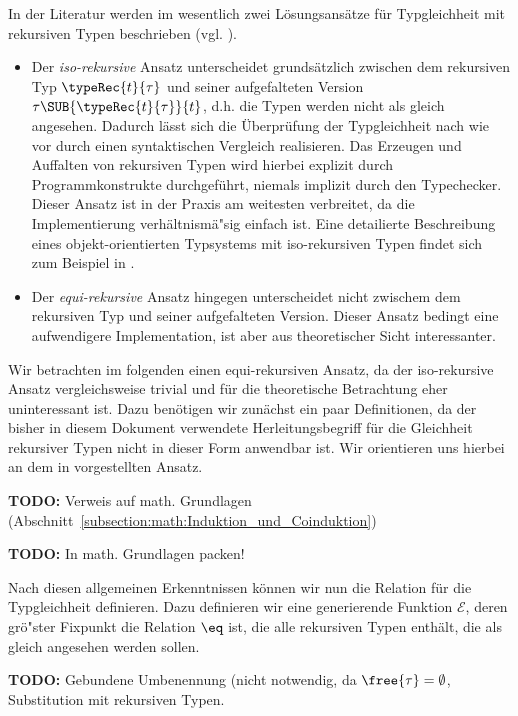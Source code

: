 In der Literatur werden im wesentlich zwei L\"osungsans\"atze f\"ur Typgleichheit mit rekursiven Typen beschrieben
(vgl. \cite[S.276ff]{Pierce02}).
\begin{itemize}
  \item Der {\em iso-rekursive} Ansatz unterscheidet grunds\"atzlich zwischen dem rekursiven Typ
        $\typeRec{t}{\tau}$ und seiner aufgefalteten Version $\tau\SUB{\typeRec{t}{\tau}}{t}$, d.h.
        die Typen werden nicht als gleich angesehen. Dadurch l\"asst sich die \"Uberpr\"ufung der Typgleichheit
        nach wie vor durch einen syntaktischen Vergleich realisieren. Das Erzeugen und Auffalten von rekursiven
        Typen wird hierbei explizit durch Programmkonstrukte durchgef\"uhrt, niemals implizit durch den Typechecker.
        Dieser Ansatz ist in der Praxis am weitesten verbreitet, da die Implementierung verh\"altnism\"a"sig einfach ist.
        Eine detailierte Beschreibung eines objekt-orientierten Typsystems mit iso-rekursiven Typen findet sich
        zum Beispiel in \cite{AbadiCardelli96}.
  \item Der {\em equi-rekursive} Ansatz hingegen unterscheidet nicht zwischem dem rekursiven Typ und seiner
        aufgefalteten Version. Dieser Ansatz bedingt eine aufwendigere Implementation, ist aber aus theoretischer
        Sicht interessanter.
\end{itemize}
Wir betrachten im folgenden einen equi-rekursiven Ansatz, da der iso-rekursive Ansatz vergleichsweise trivial und
f\"ur die theoretische Betrachtung eher uninteressant ist. Dazu ben\"otigen wir zun\"achst ein paar Definitionen,
da der bisher in diesem Dokument verwendete Herleitungsbegriff f\"ur die Gleichheit rekursiver Typen nicht in
dieser Form anwendbar ist. Wir orientieren uns hierbei an dem in \cite{Pierce02} vorgestellten Ansatz.

{\bf TODO:} Verweis auf math. Grundlagen (Abschnitt~\ref{subsection:math:Induktion_und_Coinduktion})

{\bf TODO:} In math. Grundlagen packen!

Nach diesen allgemeinen Erkenntnissen k\"onnen wir nun die Relation f\"ur die Typgleichheit definieren.
Dazu definieren wir eine generierende Funktion $\mathcal{E}$, deren gr\"o"ster Fixpunkt die Relation
$\eq$ ist, die alle rekursiven Typen enth\"alt, die als gleich angesehen werden sollen.

{\bf TODO:} Gebundene Umbenennung (nicht notwendig, da $\free{\tau} = \emptyset$, Substitution mit rekursiven Typen.

